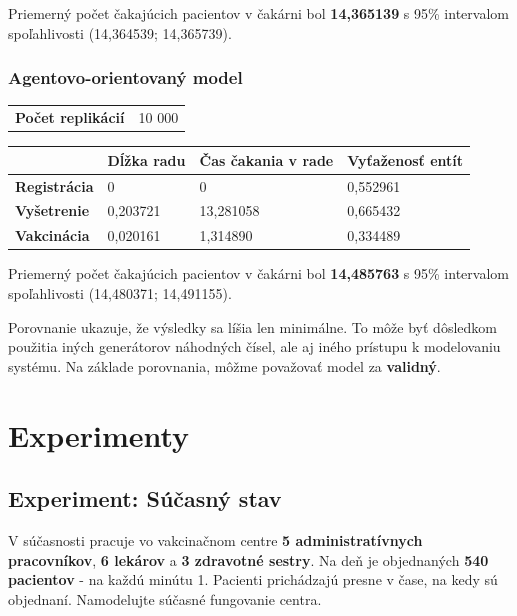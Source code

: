 \documentclass[letterpaper]{article}
\let\stdsection\section							%
\renewcommand\section{\newpage\stdsection}		%
\begin{document}
	Priemerný počet čakajúcich pacientov v čakárni bol \textbf{14,365139} s 95\% intervalom spoľahlivosti (14,364539; 14,365739).
	
	\subsubsection*{Agentovo-orientovaný model}
	
	\noindent\begin{tabular}{ll}
		\textbf{Počet replikácií} & 10 000 \\
	\end{tabular}
	
	\begin{table}[hbt!]
		\begin{tabular}{l|lll}
			& \textbf{Dĺžka radu} & \textbf{Čas čakania v rade} & \textbf{Vyťaženosť entít} \\
			\hline
			\textbf{Registrácia} 	& 0                   & 0                           & 0,552961                  \\
			\textbf{Vyšetrenie}  	& 0,203721            & 13,281058                   & 0,665432                  \\
			\textbf{Vakcinácia}  	& 0,020161            & 1,314890                    & 0,334489                 
		\end{tabular}
	\end{table}
	
	Priemerný počet čakajúcich pacientov v čakárni bol \textbf{14,485763} s 95\% intervalom spoľahlivosti (14,480371; 14,491155).
	
	Porovnanie ukazuje, že výsledky sa líšia len minimálne. To môže byť dôsledkom použitia iných generátorov náhodných čísel, ale aj iného prístupu k modelovaniu systému. Na základe porovnania, môžme považovať model za \textbf{validný}.
	
	\section{Experimenty}
	
	\subsection{Experiment: Súčasný stav}
	
	V súčasnosti pracuje vo vakcinačnom centre \textbf{5 administratívnych pracovníkov}, \textbf{6 lekárov} a \textbf{3 zdravotné sestry}. Na deň je objednaných \textbf{540 pacientov} - na každú minútu 1. Pacienti prichádzajú presne v čase, na kedy sú objednaní. Namodelujte súčasné fungovanie centra. 
	
\end{document}

